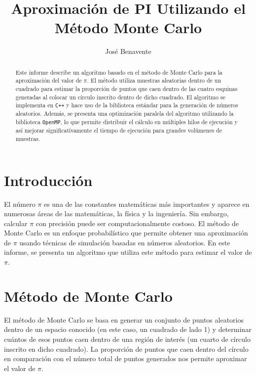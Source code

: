 \documentclass[a4paper, 10pt, onecolumn]{IEEEtran}
\begin{document}
  
  \title{Aproximación de PI Utilizando el Método Monte Carlo}
  \author{José Benavente}
  \maketitle
  
  \newpage
  
  \tableofcontents
  
  \listoffigures
  
  \listoftables
  
  \lstlistoflistings
  
  \newpage


\begin{abstract}
Este informe describe un algoritmo basado en el método de Monte Carlo para la aproximación del valor de $\pi$. El método utiliza muestras aleatorias dentro de un cuadrado para estimar la proporción de puntos que caen dentro de las cuatro esquinas generadas al colocar un círculo inscrito dentro de dicho cuadrado. El algoritmo se implementa en \texttt{C++} y hace uso de la biblioteca estándar para la generación de números aleatorios. Además, se presenta una optimización paralela del algoritmo utilizando la biblioteca \texttt{OpenMP}, lo que permite distribuir el cálculo en múltiples hilos de ejecución y así mejorar significativamente el tiempo de ejecución para grandes volúmenes de muestras.
\end{abstract}

\section{Introducción}
El número $\pi$ es una de las constantes matemáticas más importantes y aparece en numerosas áreas de las matemáticas, la física y la ingeniería. Sin embargo, calcular $\pi$ con precisión puede ser computacionalmente costoso. El método de Monte Carlo es un enfoque probabilístico que permite obtener una aproximación de $\pi$ usando técnicas de simulación basadas en números aleatorios. En este informe, se presenta un algoritmo que utiliza este método para estimar el valor de $\pi$.

\section{Método de Monte Carlo}
El método de Monte Carlo se basa en generar un conjunto de puntos aleatorios dentro de un espacio conocido (en este caso, un cuadrado de lado 1) y determinar cuántos de esos puntos caen dentro de una región de interés (un cuarto de círculo inscrito en dicho cuadrado). La proporción de puntos que caen dentro del círculo en comparación con el número total de puntos generados nos permite aproximar el valor de $\pi$.
\end{document}
